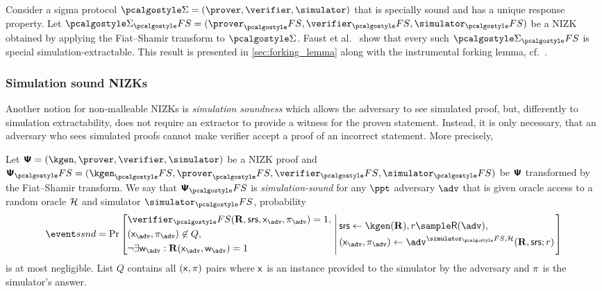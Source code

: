 \documentclass[runningheads,11pt]{llncs}
\begin{document}
Consider a sigma protocol $\sigmaprot = (\prover, \verifier, \simulator)$ that
is specially sound and has a unique response property. Let $\sigmaprot_\fs =
(\prover_\fs, \verifier_\fs, \simulator_\fs)$ be a NIZK obtained by applying the
Fiat--Shamir transform to $\sigmaprot$. Faust et al.~\cite{INDOCRYPT:FKMV12}
show that every such $\sigmaprot_\fs$ is special simulation-extractable. This result is
presented in \cref{sec:forking_lemma} along with the instrumental forking lemma,
cf.~\cite{CCS:BelNev06}.

\subsubsection{Simulation sound NIZKs}
Another notion for non-malleable NIZKs is \emph{simulation soundness} which
allows the adversary to see simulated proof, but, differently to simulation
extractability, does not require an extractor to provide a witness for the
proven statement. Instead, it is only necessary, that an adversary who sees
simulated proofs cannot make verifier accept a proof of an incorrect
statement. More precisely,

\begin{definition}
  	\label{def:simsnd}
    Let $\ps = (\kgen, \prover, \verifier, \simulator)$ be a NIZK proof and
    $\ps_\fs = (\kgen_\fs, \prover_\fs, \verifier_\fs, \simulator_\fs)$ be $\bm{\mathsf{\Psi}}$
    transformed by the Fiat--Shamir transform. We say that $\ps_\fs$ is
    \emph{simulation-sound}
    for any $\ppt$ adversary $\adv$ that is given oracle access to a random
    oracle $\mathcal{H}$ and simulator $\simulator_\fs$, probability
    \[
      \ssndProb =
      \Pr\left[
        \begin{aligned}
          & \verifier_\fs(\REL, \srs, \inp_{\adv}, \zkproof_{\adv}) = 1,\\
          & (\inp_{\advse}, \zkproof_{\advse}) \not\in Q,\\
          & \neg \exists \wit_{\adv}: \REL(\inp_{\adv}, \wit_{\adv}) = 1
        \end{aligned}
        \, \left| \,
          \vphantom{\begin{aligned}
          & \verifier_\fs(\REL, \srs, \inp_{\adv}, \zkproof_{\adv}) = 1,\\
          & (\inp_{\advse}, \zkproof_{\advse}) \not\in Q,\\
          & \neg \exists \wit_{\adv}: \REL(\inp_{\adv}, \wit_{\adv}) = 1
        \end{aligned}}
      \begin{aligned}
        & \srs \gets \kgen(\REL), r \sample \RND{\advse},\\
        & (\inp_{\advse}, \zkproof_{\advse}) \gets \advse^{\simulator_\fs,
          \ro} (\REL, \srs; r)
      \end{aligned}
		\right.  \right]
    \]
    is at most negligible.  List $Q$ contains all $(\mathsf{x}, \pi)$ pairs where
  $\mathsf{x}$ is an instance provided to the simulator by the adversary and
  $\pi$ is the simulator's answer. 
\end{definition}
\end{document}

